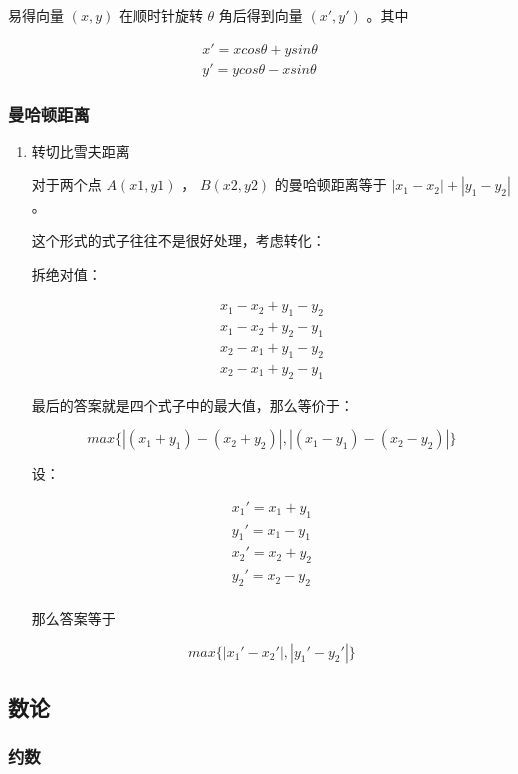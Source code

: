 \documentclass[11pt]{article}
\begin{document}
易得向量 $(x,y)$ 在顺时针旋转 $\theta$ 角后得到向量 $(x',y')$ 。其中

$$ \begin{aligned}
x'=xcos \theta+ysin\theta \\
y'=ycos \theta-xsin\theta
\end{aligned} $$

\subsubsection{曼哈顿距离}
\label{sec-3-2-2}
\begin{enumerate}
\item 转切比雪夫距离
\label{sec-3-2-2-1}

对于两个点 $A(x1,y1)$ ， $B(x2,y2)$ 的曼哈顿距离等于 $|x_1-x_2|+|y_1-y_2|$ 。  

这个形式的式子往往不是很好处理，考虑转化：

拆绝对值：

$$ \begin{aligned}
x_1-x_2+y_1-y_2 \\
x_1-x_2+y_2-y_1 \\
x_2-x_1+y_1-y_2 \\
x_2-x_1+y_2-y_1
\end{aligned} $$

最后的答案就是四个式子中的最大值，那么等价于：

$$
max\{|(x_1+y_1)-(x_2+y_2)|,|(x_1-y_1)-(x_2-y_2)|\}
$$

设：

$$ \begin{aligned}
x_1'=x_1+y_1 \\
y_1'=x_1-y_1 \\
x_2'=x_2+y_2 \\
y_2'=x_2-y_2 \\
\end{aligned} $$


那么答案等于

$$
max\{|x_1'-x_2'|,|y_1'-y_2'|\}
$$
\end{enumerate}

\subsection{数论}
\label{sec-3-3}
\subsubsection{约数}
\label{sec-3-3-1}
\end{document}
